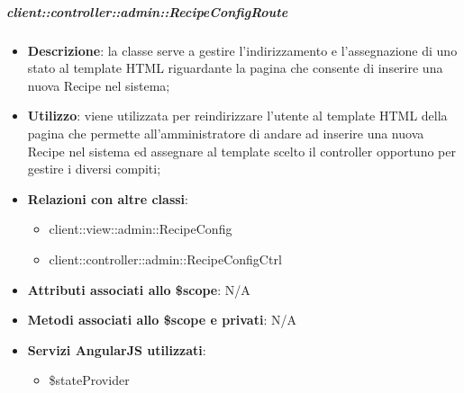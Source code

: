 		\subparagraph{client::controller::admin::RecipeConfigRoute} %
		\label{subp:bdsm_app_client_controller_admin_recipeconfigroute}

			\begin{itemize}
				\item \textbf{Descrizione}: la classe serve a gestire l'indirizzamento e l'assegnazione di uno stato al template HTML riguardante la pagina che consente di inserire una nuova Recipe nel sistema;
				\item \textbf{Utilizzo}: viene utilizzata per reindirizzare l'utente al template HTML della pagina che permette all'amministratore di andare ad inserire una nuova Recipe nel sistema ed assegnare al template scelto il controller opportuno per gestire i diversi compiti;
				\item \textbf{Relazioni con altre classi}:
					\begin{itemize}
						\item client::view::admin::RecipeConfig
						\item client::controller::admin::RecipeConfigCtrl
					\end{itemize}
				\item \textbf{Attributi associati allo \$scope}: N/A
				\item \textbf{Metodi associati allo \$scope e privati}: N/A
				\item \textbf{Servizi AngularJS utilizzati}:
					\begin{itemize}
						\item \$stateProvider
					\end{itemize}
			\end{itemize}

